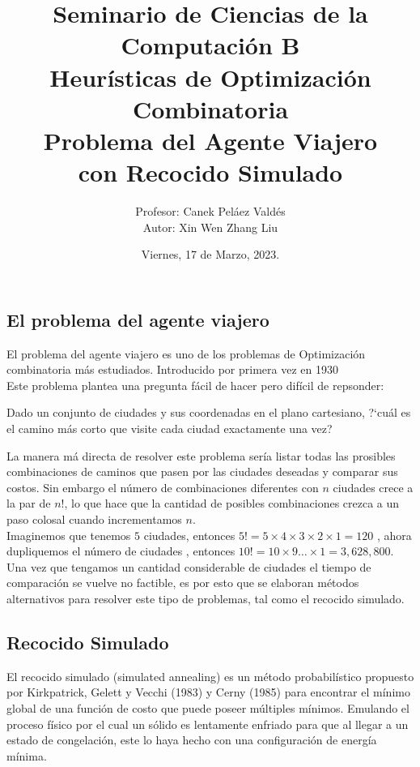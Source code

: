\documentclass[a4paper]{article}
\title { \Large{Seminario de Ciencias de la Computaci\'on B}\protect\\
  \large{Heurísticas de Optimización Combinatoria}\protect\\
  \large{Problema del Agente Viajero\\con Recocido Simulado}}
\date{\normalsize{Viernes, 17 de Marzo, 2023.}}
\author{\normalsize{Profesor: Canek Peláez Valdés}\protect\\
  \normalsize{Autor: Xin Wen Zhang Liu}}\vspace{0.2cm}
\begin{document}
\allowdisplaybreaks
\maketitle

\subsection*{El problema del agente viajero}
El problema del agente viajero es uno de los problemas de Optimización combinatoria m\'as estudiados. Introducido por primera vez en 1930 \\

Este problema plantea una pregunta f\'acil de hacer pero dif\'icil de repsonder:
\begin{center}
  Dado un conjunto de ciudades y sus coordenadas en el plano cartesiano, ?`cu\'al es el camino m\'as corto que visite cada ciudad exactamente una vez?
\end{center}
La manera m\'a directa de resolver este problema ser\'ia listar todas las prosibles combinaciones de caminos que pasen por las ciudades deseadas y comparar sus costos. Sin embargo el n\'umero de combinaciones diferentes con $n$ ciudades crece a la par de  $n!$, lo que hace que la cantidad de posibles combinaciones crezca a un paso colosal cuando incrementamos $n$.\\

Imaginemos que tenemos $5$ ciudades, entonces $5! = 5\times 4\times 3 \times 2\times 1 = 120$ , ahora dupliquemos el n\'umero de ciudades , entonces $10! = 10 \times 9 \dots \times 1 = 3,628,800$. Una vez que tengamos un cantidad considerable de ciudades el tiempo de comparaci\'on se vuelve no factible,  es por esto que se elaboran m\'etodos alternativos para resolver este tipo de problemas, tal como el recocido simulado.

\subsection*{Recocido Simulado}
El  recocido simulado  (simulated annealing)  es un m\'etodo probabil\'istico propuesto por Kirkpatrick, Gelett y Vecchi (1983) y Cerny (1985) para encontrar el m\'inimo global de una funci\'on de costo que puede poseer m\'ultiples m\'inimos. Emulando el proceso f\'isico por el cual un s\'olido es lentamente enfriado para que al llegar a un estado de congelaci\'on, este lo haya hecho con una configuraci\'on de energ\'ia m\'inima.  ~\cite{sa}\\
\end{document}

